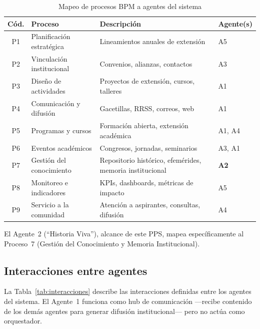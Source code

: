 \documentclass[a4paper, 12pt]{article}
\begin{document}
\begin{table}[htbp]
  \centering
  \caption{Mapeo de procesos BPM a agentes del sistema}
  \label{tab:bpm-agentes}
  \begin{tabularx}{\textwidth}{clXl}
    \toprule
    \textbf{C\'od.} & \textbf{Proceso} & \textbf{Descripci\'on} & \textbf{Agente(s)} \\
    \midrule
    P1 & Planificaci\'on estrat\'egica & Lineamientos anuales de extensi\'on & A5 \\
    P2 & Vinculaci\'on institucional & Convenios, alianzas, contactos & A3 \\
    P3 & Dise\~no de actividades & Proyectos de extensi\'on, cursos, talleres & A1 \\
    P4 & Comunicaci\'on y difusi\'on & Gacetillas, RRSS, correos, web & A1 \\
    P5 & Programas y cursos & Formaci\'on abierta, extensi\'on acad\'emica & A1, A4 \\
    P6 & Eventos acad\'emicos & Congresos, jornadas, seminarios & A3, A1 \\
    P7 & Gesti\'on del conocimiento & Repositorio hist\'orico, efem\'erides, memoria institucional & \textbf{A2} \\
    P8 & Monitoreo e indicadores & KPIs, dashboards, m\'etricas de impacto & A5 \\
    P9 & Servicio a la comunidad & Atenci\'on a aspirantes, consultas, difusi\'on & A4 \\
    \bottomrule
  \end{tabularx}
\end{table}

El Agente~2 (``Historia Viva''), alcance de este PPS, mapea espec\'ificamente al Proceso~7 (Gesti\'on del Conocimiento y Memoria Institucional).

\subsection{Interacciones entre agentes}

La Tabla~\ref{tab:interacciones} describe las interacciones definidas entre los agentes del sistema. El Agente~1 funciona como hub de comunicaci\'on ---recibe contenido de los dem\'as agentes para generar difusi\'on institucional--- pero no act\'ua como orquestador.
\end{document}
